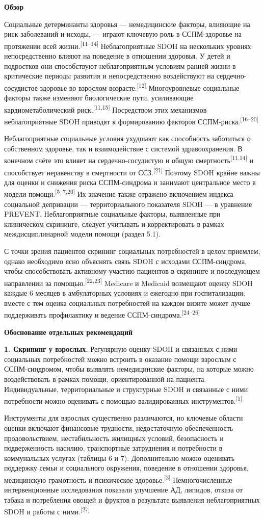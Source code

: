 \documentclass[11pt,a4paper]{article}
\newcommand{\src}[1]{\textsuperscript{[#1]}}
\newcommand{\heading}[1]{\par\medskip\textbf{#1}\par}
\begin{document}
\heading{Обзор}
Социальные детерминанты здоровья --- немедицинские факторы, влияющие на риск заболеваний и исходы, --- играют ключевую роль в ССПМ-здоровье на протяжении всей жизни.\src{11--14} Неблагоприятные SDOH на нескольких уровнях непосредственно влияют на поведение в отношении здоровья. У детей и подростков они способствуют неблагоприятным условиям ранней жизни в критические периоды развития и непосредственно воздействуют на сердечно-сосудистое здоровье во взрослом возрасте.\src{12} Многоуровневые социальные факторы также изменяют биологические пути, усиливающие кардиометаболический риск.\src{11,15} Посредством этих механизмов неблагоприятные SDOH приводят к формированию факторов ССПМ-риска.\src{16--20}

Неблагоприятные социальные условия ухудшают как способность заботиться о собственном здоровье, так и взаимодействие с системой здравоохранения. В конечном счёте это влияет на сердечно-сосудистую и общую смертность\src{11,14} и способствует неравенству в смертности от ССЗ.\src{21} Поэтому SDOH крайне важны для оценки и снижения риска ССПМ-синдрома и занимают центральное место в модели помощи.\src{5--7,20} Их значение также отражено включением индекса социальной депривации --- территориального показателя SDOH --- в уравнение PREVENT. Неблагоприятные социальные факторы, выявленные при клиническом скрининге, следует учитывать и корректировать в рамках междисциплинарной модели помощи (раздел 5.1).

С точки зрения пациентов скрининг социальных потребностей в целом приемлем, однако необходимо ясно объяснять связь SDOH с исходами ССПМ-синдрома, чтобы способствовать активному участию пациентов в скрининге и последующем направлении за помощью.\src{22,23} Medicare и Medicaid возмещают оценку SDOH каждые 6 месяцев в амбулаторных условиях и ежегодно при госпитализации; вместе с тем оценка социальных потребностей на каждом визите может лучше поддерживать профилактику и ведение ССПМ-синдрома.\src{24--26}

\heading{Обоснование отдельных рекомендаций}
\textbf{1. Скрининг у взрослых.} Регулярную оценку SDOH и связанных с ними социальных потребностей можно встроить в оказание помощи взрослым с ССПМ-синдромом, чтобы выявлять немедицинские факторы, на которые можно воздействовать в рамках помощи, ориентированной на пациента. Индивидуальные, территориальные и структурные SDOH и связанные с ними потребности можно оценивать с помощью валидированных инструментов.\src{1}

Инструменты для взрослых существенно различаются, но ключевые области оценки включают финансовые трудности, недостаточную обеспеченность продовольствием, нестабильность жилищных условий, безопасность и подверженность насилию, транспортные затруднения и потребности в коммунальных услугах (таблицы 6 и 7). Дополнительно можно оценивать поддержку семьи и социального окружения, поведение в отношении здоровья, медицинскую грамотность и психическое здоровье.\src{3} Немногочисленные интервенционные исследования показали улучшение АД, липидов, отказа от табака и потребления овощей и фруктов в результате выявления неблагоприятных SDOH и работы с ними.\src{27}
\end{document}
